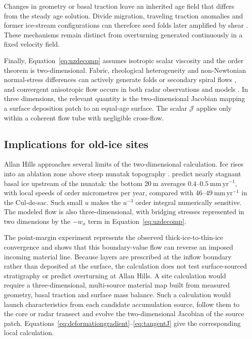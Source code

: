 \documentclass[review]{igs}
\begin{document}
Changes in geometry or basal traction leave an inherited age field that differs from the steady age solution. Divide migration, traveling traction anomalies and former ice-stream configurations can therefore seed folds later amplified by shear \citep{JacobelBindschadler1993,JacobsonWaddington2005,Wolovick2014,WolovickCreyts2016,Franke2022,Jansen2024}. These mechanisms remain distinct from overturning generated continuously in a fixed velocity field.

Finally, Equation~\ref{eq:uzdecomp} assumes isotropic scalar viscosity and the order theorem is two-dimensional. Fabric, rheological heterogeneity and non-Newtonian normal-stress differences can actively generate folds or secondary spiral flows \citep{Alley1997,ThorsteinssonWaddington2002,SchoofClarke2008,Bons2016,Bons2025}, and convergent anisotropic flow occurs in both radar observations and models \citep{Ross2020,MartinGudmundssonPritchardGagliardini2009}. In three dimensions, the relevant quantity is the two-dimensional Jacobian mapping a surface deposition patch to an equal-age surface. The scalar \(\mathcal{J}\) applies only within a coherent flow tube with negligible cross-flow.

\subsection{Implications for old-ice sites}

Allan Hills approaches several limits of the two-dimensional calculation. Ice rises into an ablation zone above steep nunatak topography \citep{Spaulding2012,Kehrl2018,Stoll2026}. \citet{Manos2026} predict nearly stagnant basal ice upstream of the nunatak: the bottom \(20~\mathrm{m}\) averages \(0.4\)--\(0.5~\mathrm{mm\,yr^{-1}}\), with local speeds of order micrometres per year, compared with \(46\)--\(49~\mathrm{mm\,yr^{-1}}\) in the Cul-de-sac. Such small \(u\) makes the \(u^{-3}\) order integral numerically sensitive. The modeled flow is also three-dimensional, with bridging stresses represented in two dimensions by the \(-w_x\) term in Equation~\ref{eq:uzdecomp}.

The point-margin experiment represents the observed thick-ice-to-thin-ice convergence and shows that this boundary-value flow can reverse an imposed incoming material line. Because layers are prescribed at the inflow boundary rather than deposited at the surface, the calculation does not test surface-sourced stratigraphy or predict overturning at Allan Hills. A site calculation would require a three-dimensional, multi-source material map built from measured geometry, basal traction and surface mass balance. Such a calculation would launch characteristics from each candidate accumulation source, follow them to the core or radar transect and evolve the two-dimensional Jacobian of the source patch. Equations~\ref{eq:deformationgradient}--\ref{eq:tangentJ} give the corresponding local calculation.
\end{document}
